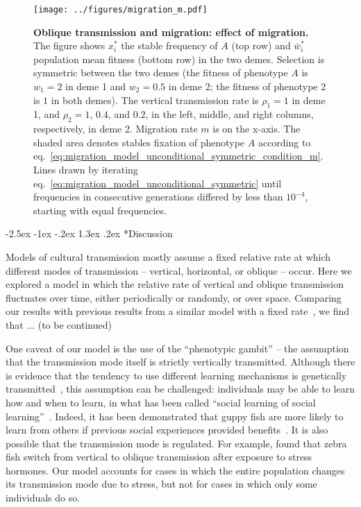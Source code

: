 \documentclass[11pt]{extarticle}
\makeatletter
\renewcommand\section{\@startsection {section}{1}{\z@}%
     {-2.5ex \@plus -1ex \@minus -.2ex}%
     {1.3ex \@plus.2ex}%
    {\Large\bfseries}}
\makeatother
\begin{document}
\begin{figure*}[ht]
\centering
\texttt{[image: ../figures/migration\_m.pdf]}
\caption{
\textbf{Oblique transmission and migration: effect of migration.} 
The figure shows $x^*_i$ the stable frequency of $A$ (top row) and $\bar{w}^*_i$ population mean fitness (bottom row) in the two demes.
Selection is symmetric between the two demes (the fitness of phenotype $A$ is $w_1=2$ in deme 1 and $w_2=0.5$ in deme 2; the fitness of phenotype 2 is $1$ in both demes).
The vertical transmission rate is $\rho_1=1$ in deme 1, and $\rho_2=1$, $0.4$, and $0.2$, in the left, middle, and right columns, respectively, in deme 2.
Migration rate $m$ is on the x-axis.
The shaded area denotes stables fixation of phenotype $A$ according to eq.~\ref{eq:migration_model_unconditional_symmetric_condition_m}.
Lines drawn by iterating eq.~\ref{eq:migration_model_unconditional_symmetric} until frequencies in consecutive generations differed by less than $10^{-4}$, starting with equal frequencies.
}
\label{fig:migration_m}
\end{figure*}

\section*{Discussion}

Models of cultural transmission mostly assume a fixed relative rate at which different modes of transmission -- vertical, horizontal, or oblique -- occur.
Here we explored a model in which the relative rate of vertical and oblique transmission fluctuates over time, either periodically or randomly, or over space.
Comparing our results with previous results from a similar model with a fixed rate~\citep{Ram2018}, we find that $\ldots$ (to be continued) %

One caveat of our model is the use of the ``phenotypic gambit'' -- the assumption that the transmission mode itself is strictly vertically transmitted.
Although there is evidence that the tendency to use different learning mechanisms is genetically transmitted~\citep{Foucaud2013}, this assumption can be challenged: individuals may be able to learn how and when to learn, in what has been called ``social learning of social learning''~\citep{Mesoudi2016}.
Indeed, it has been demonstrated that guppy fish are more likely to learn from others if previous social experiences provided benefits~\citep{Leris2016}.
It is also possible that the transmission mode is regulated.
For example, \citet{Farine2015} found that zebra fish switch from vertical to oblique transmission after exposure to stress hormones.
Our model accounts for cases in which the entire population changes its transmission mode due to stress, but not for cases in which only some individuals do so.
\end{document}

